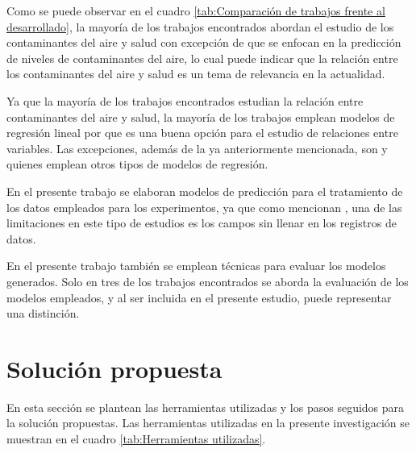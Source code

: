 \documentclass[3p,times]{elsarticle}
\begin{document}
Como se puede observar en el cuadro \ref{tab:Comparación de trabajos frente al desarrollado}, la mayoría de los trabajos encontrados abordan el estudio de los contaminantes del aire y salud con excepción de \citet{r13} que se enfocan en la predicción de niveles de contaminantes del aire, lo cual puede indicar que la relación entre los contaminantes del aire y salud es un tema de relevancia en la actualidad. 

Ya que la mayoría de los trabajos encontrados estudian la relación entre contaminantes del aire y salud, la mayoría de los trabajos emplean modelos de regresión lineal por que es una buena opción para el estudio de relaciones entre variables. Las excepciones, además de la ya anteriormente mencionada, son \citet{r17} y \citet{r18} quienes emplean otros tipos de modelos de regresión.

En el presente trabajo se elaboran modelos de predicción para el tratamiento de los datos empleados para los experimentos, ya que como mencionan \citet{r15}, una de las limitaciones en este tipo de estudios es los campos sin llenar en los registros de datos.

En el presente trabajo también se emplean técnicas para evaluar los modelos generados. Solo en tres de los trabajos encontrados se aborda la evaluación de los modelos empleados, y al ser incluida en el presente estudio, puede representar una distinción.

\section{Solución propuesta}

En esta sección se plantean las herramientas utilizadas y los pasos seguidos para la solución propuestas. Las herramientas utilizadas en la presente investigación se muestran en el cuadro \ref{tab:Herramientas utilizadas}.
\end{document}
